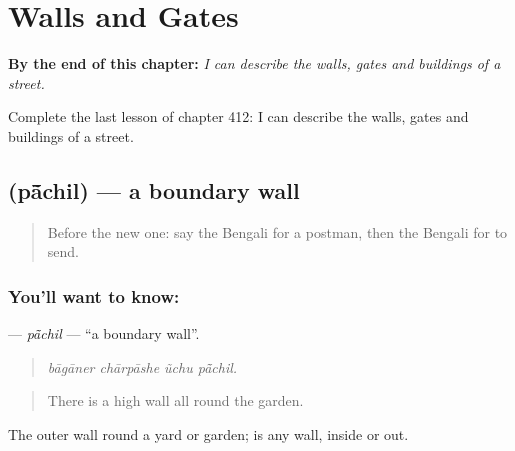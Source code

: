 
\chapter{Walls and Gates}
\label{ch:bn-walls-and-gates}

\begin{chapteropening}
\textbf{By the end of this chapter:} \emph{I can describe the walls, gates and buildings of a street.}

Complete the last lesson of chapter 412: I can describe the walls, gates and buildings of a street.
\end{chapteropening}

\section[\texorpdfstring{\bn{পাঁচিল} (pā̃chil)}{পাঁচিল (pā̃chil)}]{ (pā̃chil) — a boundary wall}

\label{lesson:BN-C412-pachil}



\begin{quote}
Before the new one: say the Bengali for a postman, then the Bengali for to send.
\end{quote}

\subsection*{You'll want to know: }
\textbf{} — \emph{pā̃chil} — \textquotedblleft{}a boundary wall\textquotedblright{}.

\begin{quote}
   
\end{quote}

\begin{quote}
\emph{bāgāner chārpāshe ũchu pā̃chil.}
\end{quote}

\begin{quote}
There is a high wall all round the garden.
\end{quote}

The outer wall round a yard or garden;  is any wall, inside or out.

